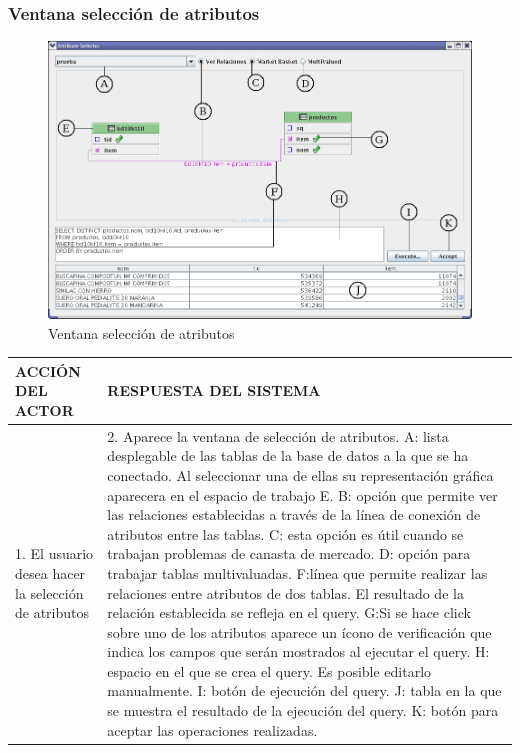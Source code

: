 \subsubsection{Ventana selecci\'on de atributos}
\begin{figure}[ht]
\centering
\includegraphics[width=1\textwidth]{images/attverMark.png}
\caption{Ventana selecci\'on de atributos}
\end{figure}
\begin{center}
\begin{tabular}{|p{60mm}|p{60mm}|} \hline
ACCI\'ON DEL ACTOR & RESPUESTA DEL SISTEMA \\ \hline
1. El usuario desea hacer la selecci\'on de atributos  & 2. Aparece la ventana de selecci\'on de atributos. A: lista desplegable de las tablas de la base de datos a la que se ha conectado. Al seleccionar una de ellas su representaci\'on gr\'afica aparecera en el espacio de trabajo E. B: opci\'on que permite ver las relaciones establecidas a trav\'es de la l\'inea de conexi\'on de atributos entre las tablas. C: esta opci\'on es \'util cuando se trabajan problemas de canasta de mercado. D: opci\'on para trabajar tablas multivaluadas. F:l\'inea que permite realizar las relaciones entre atributos de dos tablas. El resultado de la relaci\'on establecida se refleja en el query. G:Si se hace click sobre uno de los atributos aparece un \'icono de verificaci\'on que indica los campos que ser\'an mostrados al ejecutar el query. H: espacio en el que se crea el query. Es posible editarlo manualmente. I: bot\'on de ejecuci\'on del query. J: tabla en la que se muestra el resultado de la ejecuci\'on del query. K: bot\'on para aceptar las operaciones realizadas.   \\ \hline
\end{tabular}
\end{center}

